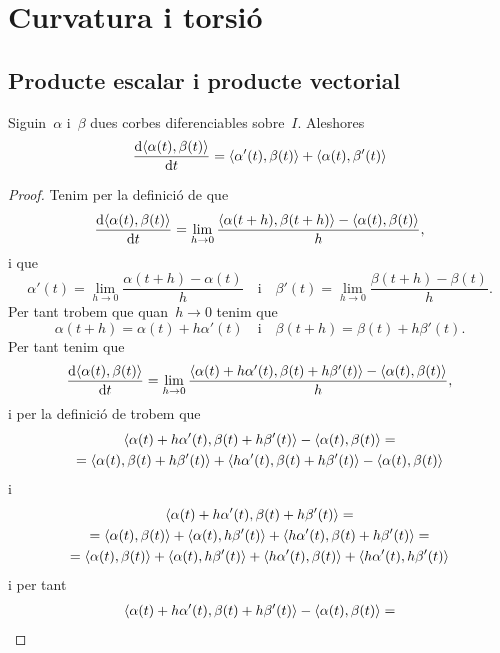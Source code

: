 \documentclass[../../main.tex]{subfiles}
\begin{document}
\section{Curvatura i torsió}
	\subsection{Producte escalar i producte vectorial}
	\begin{proposition}
		\label{prop:derivada del producte escalar de dues corbes}
		Siguin~\(\alpha\) i~\(\beta\) dues corbes diferenciables sobre~\(I\).
		Aleshores
		\[
		    \frac{\diff\prodesc{\alpha(t)}{\beta(t)}}{\diff t}=\prodesc{\alpha'(t)}{\beta(t)}+\prodesc{\alpha(t)}{\beta'(t)}
		\]
		\begin{proof}
			Tenim per la definició de  que
			\[
			    \frac{\diff\prodesc{\alpha(t)}{\beta(t)}}{\diff t}=\lim_{h\to0}\frac{\prodesc{\alpha(t+h)}{\beta(t+h)}-\prodesc{\alpha(t)}{\beta(t)}}{h},
			\]
			i que
			\[
			    \alpha'(t)=\lim_{h\to0}\frac{\alpha(t+h)-\alpha(t)}{h}\quad\text{i}\quad\beta'(t)=\lim_{h\to0}\frac{\beta(t+h)-\beta(t)}{h}.
			\]
			Per tant trobem que quan~\(h\to0\) tenim que
			\[
			    \alpha(t+h)=\alpha(t)+h\alpha'(t)\quad\text{i}\quad\beta(t+h)=\beta(t)+h\beta'(t).
			\]
			Per tant tenim que
			\[
			    \frac{\diff\prodesc{\alpha(t)}{\beta(t)}}{\diff t}=\lim_{h\to0}\frac{\prodesc{\alpha(t)+h\alpha'(t)}{\beta(t)+h\beta'(t)}-\prodesc{\alpha(t)}{\beta(t)}}{h},
			\]
			i per la definició de  trobem que
			\begin{multline*}
				\prodesc{\alpha(t)+h\alpha'(t)}{\beta(t)+h\beta'(t)}-\prodesc{\alpha(t)}{\beta(t)}=\\
				=\prodesc{\alpha(t)}{\beta(t)+h\beta'(t)}+\prodesc{h\alpha'(t)}{\beta(t)+h\beta'(t)}-\prodesc{\alpha(t)}{\beta(t)}
			\end{multline*}
			i
			\begin{multline*}
				\prodesc{\alpha(t)+h\alpha'(t)}{\beta(t)+h\beta'(t)}=\\
				=\prodesc{\alpha(t)}{\beta(t)}+\prodesc{\alpha(t)}{h\beta'(t)}+\prodesc{h\alpha'(t)}{\beta(t)+h\beta'(t)}=\\
				=\prodesc{\alpha(t)}{\beta(t)}+\prodesc{\alpha(t)}{h\beta'(t)}+\prodesc{h\alpha'(t)}{\beta(t)}+\prodesc{h\alpha'(t)}{h\beta'(t)}
			\end{multline*}
			i per tant
			\begin{multline*}
				\prodesc{\alpha(t)+h\alpha'(t)}{\beta(t)+h\beta'(t)}-\prodesc{\alpha(t)}{\beta(t)}=\\

\end{multline*}
\end{proof}
\end{proposition}
\end{document}
